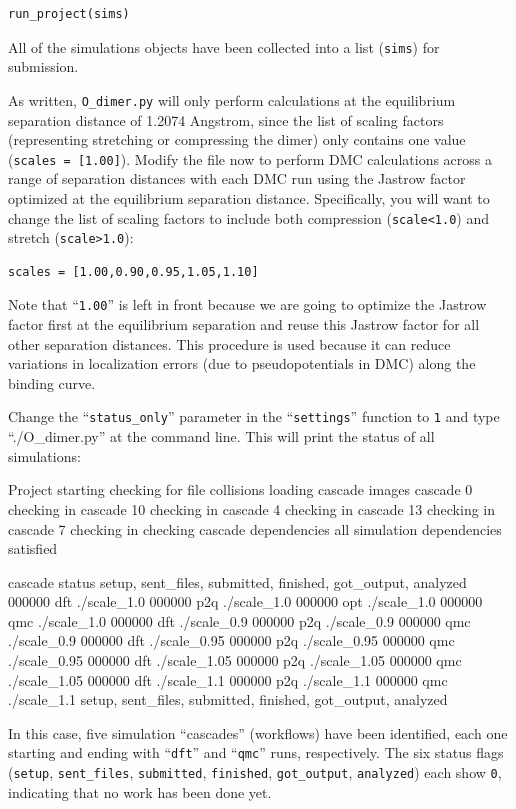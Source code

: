 \begin{lstlisting}
run_project(sims)
\end{lstlisting}
\noindent
All of the simulations objects have been collected into a list (\texttt{sims}) for submission.

As written, \texttt{O\_dimer.py} will only perform calculations at the equilibrium separation distance of 1.2074 Angstrom, since the list of scaling factors (representing stretching or compressing the dimer) only contains one value (\texttt{scales = [1.00]}).  Modify the file now to perform DMC calculations across a range of separation distances with each DMC run using the Jastrow factor optimized at the equilibrium separation distance.  Specifically, you will want to change the list of scaling factors to include both compression (\texttt{scale<1.0}) and stretch (\texttt{scale>1.0}): 
\begin{lstlisting}
scales = [1.00,0.90,0.95,1.05,1.10]
\end{lstlisting}
\noindent
Note that ``\texttt{1.00}'' is left in front because we are going to optimize the Jastrow factor first at the equilibrium separation and reuse this Jastrow factor for all other separation distances.  This procedure is used because it can reduce variations in localization errors (due to pseudopotentials in DMC) along the binding curve. 

Change the ``\texttt{status\_only}'' parameter in the ``\texttt{settings}'' function to \texttt{1} and type ``./O\_dimer.py'' at the command line.  This will print the status of all simulations:
\begin{shade}
Project starting 
  checking for file collisions 
  loading cascade images 
    cascade 0 checking in 
    cascade 10 checking in 
    cascade 4 checking in 
    cascade 13 checking in 
    cascade 7 checking in 
  checking cascade dependencies 
    all simulation dependencies satisfied 
  
  cascade status 
    setup, sent_files, submitted, finished, got_output, analyzed 
    000000  dft     ./scale_1.0 
    000000  p2q     ./scale_1.0 
    000000  opt     ./scale_1.0 
    000000  qmc     ./scale_1.0 
    000000  dft     ./scale_0.9 
    000000  p2q     ./scale_0.9 
    000000  qmc     ./scale_0.9 
    000000  dft     ./scale_0.95 
    000000  p2q     ./scale_0.95 
    000000  qmc     ./scale_0.95 
    000000  dft     ./scale_1.05 
    000000  p2q     ./scale_1.05 
    000000  qmc     ./scale_1.05 
    000000  dft     ./scale_1.1 
    000000  p2q     ./scale_1.1 
    000000  qmc     ./scale_1.1 
    setup, sent_files, submitted, finished, got_output, analyzed 
\end{shade}
\noindent
In this case, five simulation ``cascades'' (workflows) have been identified, each one starting and ending with ``\texttt{dft}'' and ``\texttt{qmc}'' runs, respectively.  The six status flags (\texttt{setup}, \texttt{sent\_files}, \texttt{submitted}, \texttt{finished}, \texttt{got\_output}, \texttt{analyzed}) each show \texttt{0}, indicating that no work has been done yet.  

